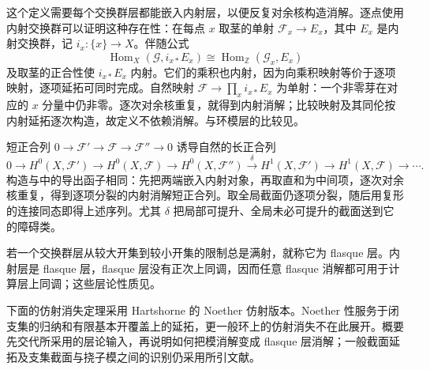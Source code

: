 这个定义需要每个交换群层都能嵌入内射层，以便反复对余核构造消解。逐点使用内射交换群可以证明这种存在性：在每点 \(x\) 取茎的单射 \(\mathcal F_x\to E_x\)，其中 \(E_x\) 是内射交换群，记 \(i_x:\{x\}\to X\)。伴随公式
\[
	\operatorname{Hom}_X(\mathcal G,i_{x*}E_x) \cong\operatorname{Hom}_{\mathbb Z}(\mathcal G_x,E_x)
\]
及取茎的正合性使 \(i_{x*}E_x\) 内射。它们的乘积也内射，因为向乘积映射等价于逐项映射，逐项延拓可同时完成。自然映射 \(\mathcal F\to\prod_xi_{x*}E_x\) 为单射：一个非零芽在对应的 \(x\) 分量中仍非零。逐次对余核重复，就得到内射消解；比较映射及其同伦按内射延拓逐次构造，故定义不依赖消解。与环模层的比较见\cite[Chapter III, Proposition 2.2, Corollary 2.3 and Proposition 2.6, pp. 207--208]{Hartshorne1977}。

\ProseParagraphBreak
短正合列 \(0\rightarrow\mathcal F'\rightarrow\mathcal F\rightarrow\mathcal F''\rightarrow0\) 诱导自然的长正合列
\[
	0\rightarrow H^0(X,\mathcal F')\rightarrow H^0(X,\mathcal F) \rightarrow H^0(X,\mathcal F'')\xrightarrow{\delta} H^1(X,\mathcal F')\rightarrow H^1(X,\mathcal F)\rightarrow\cdots.
\]
构造与中的导出函子相同：先把两端嵌入内射对象，再取直和为中间项，逐次对余核重复，得到逐项分裂的内射消解短正合列。取全局截面仍逐项分裂，随后用复形的连接同态即得上述序列。尤其 \(\delta\) 把局部可提升、全局未必可提升的截面送到它的障碍类。

\ProseParagraphBreak
若一个交换群层从较大开集到较小开集的限制总是满射，就称它为 flasque 层。内射层是 flasque 层，flasque 层没有正次上同调，因而任意 flasque 消解都可用于计算层上同调；这些层论性质见\cite[Chapter III, Lemma 2.4, Proposition 2.5 and Remark 2.5.1, pp. 207--208]{Hartshorne1977}。

\ProseParagraphBreak
下面的仿射消失定理采用 Hartshorne 的 Noether 仿射版本\cite[Chapter III, Theorem 3.5, p. 215]{Hartshorne1977}。Noether 性服务于闭支集的归纳和有限基本开覆盖上的延拓，更一般环上的仿射消失不在此展开。概要先交代所采用的层论输入，再说明如何把模消解变成 flasque 层消解；一般截面延拓及支集截面与挠子模之间的识别仍采用所引文献。

